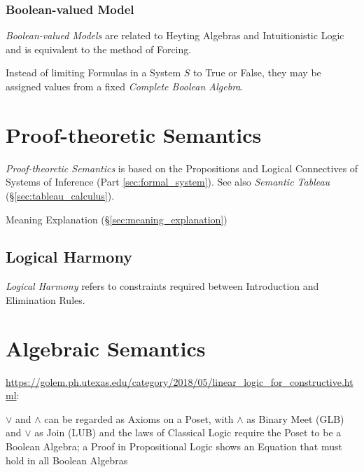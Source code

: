 \subsubsection{Boolean-valued Model}\label{sec:boolean_model}

\emph{Boolean-valued Models} are related to Heyting Algebras and
Intuitionistic Logic and is equivalent to the method of Forcing.

Instead of limiting Formulas in a System $S$ to True or False, they
may be assigned values from a fixed \emph{Complete Boolean Algebra}.



\section{Proof-theoretic Semantics}\label{sec:proof_semantics}

\emph{Proof-theoretic Semantics} is based on the Propositions and
Logical Connectives of Systems of Inference (Part
\ref{sec:formal_system}). See also \emph{Semantic Tableau}
(\S\ref{sec:tableau_calculus}).

Meaning Explanation (\S\ref{sec:meaning_explanation})



\subsection{Logical Harmony} \label{sec:logical_harmony}

\emph{Logical Harmony} refers to constraints required between
Introduction and Elimination Rules.



\section{Algebraic Semantics}\label{sec:algebraic_semantics}

\url{https://golem.ph.utexas.edu/category/2018/05/linear_logic_for_constructive.html}:

$\vee$ and $\wedge$ can be regarded as Axioms on a Poset, with $\wedge$ as
Binary Meet (GLB) and $\vee$ as Join (LUB) and the laws of Classical Logic
require the Poset to be a Boolean Algebra; a Proof in Propositional Logic shows
an Equation that must hold in all Boolean Algebras

